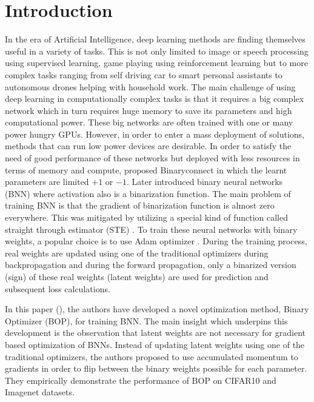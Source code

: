 \section{Introduction}
In the era of Artificial Intelligence, deep learning methods are finding themselves useful in a variety of tasks. This is not only limited to image or speech processing using supervised learning, game playing using reinforcement learning but to more complex tasks ranging from self driving car to smart personal assistants to autonomous drones helping with household work. The main challenge of using deep learning in computationally complex tasks is that it requires a big complex network which in turn requires huge memory to save its parameters and high computational power. These big networks are often trained with one or many power hungry GPUs. However, in order to enter a mass deployment of solutions, methods that can run low power devices are desirable. In order to satisfy the need of good performance of these networks but deployed with less resources in terms of memory and compute, \cite{courbariaux2015binaryconnect} proposed Binaryconnect in which the learnt parameters are limited $+1$ or $-1$. Later \cite{courbariaux2016binarized} introduced  binary neural networks (BNN) where activation also is a binarization function. The main problem of training BNN is that the gradient of binarization function is almost zero everywhere. This was mitigated by utilizing a special kind of function called straight through estimator (STE) \cite{hinton_coursera} . To train these neural networks with binary weights, a popular choice is to use Adam optimizer \cite{kingma2014adam}. During the training process, real weights are updated using one of the traditional optimizers during backpropagation and during the forward propagation, only a binarized version (sign) of these real weights (latent weights) are used for prediction and subsequent loss calculations.


In this paper (\cite{helwegen2019latent}), the authors have developed a novel optimization method, Binary Optimizer (BOP), for training BNN. The main insight which underpins this development is the observation that latent weights are not necessary for gradient based optimization of BNNs. Instead of updating latent weights using one of the traditional optimizers, the authors proposed to use accumulated momentum to gradients in order to flip between the binary weights possible for each parameter. They empirically demonstrate the performance of BOP on CIFAR10 and Imagenet datasets.

